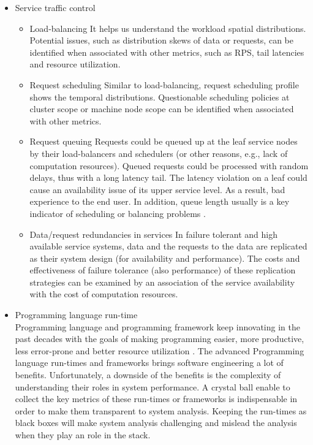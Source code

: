 \begin{itemize}
\begin{itemize}
     \item Service traffic control
        \begin{itemize}
          \item Load-balancing
            It helps us understand the workload spatial distributions. Potential issues, such as distribution skews of data or requests, can be identified when associated with other metrics, such as RPS, tail latencies and resource utilization.
          \item Request scheduling
            Similar to load-balancing, request scheduling profile shows the temporal distributions. Questionable scheduling policies at cluster scope or machine node scope can be identified when associated with other metrics.
          \item Request queuing \autocite{DBLP:journals/cacm/DeanB13,}
            Requests could be queued up at the leaf service nodes by their load-balancers and schedulers (or other reasons, e.g., lack of computation resources). Queued requests could be processed with random delays, thus with a long latency tail. The latency violation on a leaf could cause an availability issue of its upper service level. As a result, bad experience to the end user. In addition, queue length usually is a key indicator of scheduling or balancing problems \autocite{DBLP:journals/cacm/DeanB13,DBLP:conf/nsdi/KhalidRFXRFA18,DBLP:conf/usenix/HedayatiSSM19, DBLP:conf/conext/BarbetteKMK19}.
          \item Data/request redundancies in services \autocite{DBLP:journals/cacm/DeanB13}
            In failure tolerant and high available service systems, data and the requests to the data are replicated as their system design (for availability and performance). The costs and effectiveness of failure tolerance (also performance) of these replication strategies can be examined by an association of the service availability with the cost of computation resources.
        \end{itemize}
    \item Programming language run-time \\
      Programming language and programming framework keep innovating in the past decades with the goals of making programming easier, more productive, less error-prone and better resource utilization \autocite{DBLP:books/aw/AhoSU86}. The advanced Programming language run-times and frameworks brings software engineering a lot of benefits. Unfortunately, a downside of the benefits is the complexity of understanding their roles in system performance. A crystal ball enable to collect the key metrics of these run-times or frameworks is indispensable in order to make them transparent to system analysis. Keeping the run-times as black boxes will make system analysis challenging and mislead the analysis when they play an role in the stack.


\end{itemize}
\end{itemize}
